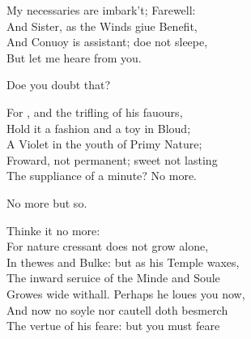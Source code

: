 \documentclass[a5paper,DIV=calc,11pt]{scrbook}
\begin{document}
\begin{drama*}
    \laerspeaks My necessaries are imbark't; Farewell:\\
    And Sister, as the Winds giue Benefit,\\
    And Conuoy is assistant; doe not sleepe,\\
    But let me heare from you.
    
    \ophespeaks Doe you doubt that?
    
    \laerspeaks For \ham, and the trifling of his fauours,\\
    Hold it a fashion and a toy in Bloud;\\
    A Violet in the youth of Primy Nature;\\
    Froward, not permanent; sweet not lasting\\
    The suppliance of a minute? No more.
    
    \ophespeaks No more but so.
    
    \laerspeaks Thinke it no more:\\
    For nature cressant does not grow alone,\\
    In thewes and Bulke: but as his Temple waxes,\\
    The inward seruice of the Minde and Soule\\
    Growes wide withall. Perhaps he loues you now,\\
    And now no soyle nor cautell doth besmerch\\
    The vertue of his feare: but you must feare
    

\end{drama*}
\end{document}
